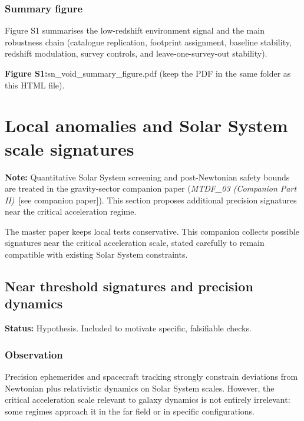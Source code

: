 \documentclass[11pt,a4paper]{article}
\begin{document}
\subsubsection{Summary figure}
Figure S1 summarises the low-redshift environment signal and the main robustness chain (catalogue replication, footprint assignment, baseline stability, redshift modulation, survey controls, and leave-one-survey-out stability).

\begin{mdframed}[linecolor=accent,linewidth=0.5pt,backgroundcolor=callout-bg,leftline=true,rightline=true,topline=true,bottomline=true,innerleftmargin=8pt,innerrightmargin=8pt,innertopmargin=6pt,innerbottommargin=6pt]
\textbf{Figure S1:}sn\_\allowbreak{}void\_\allowbreak{}summary\_\allowbreak{}figure.pdf (keep the PDF in the same folder as this HTML file).
\end{mdframed}

\section{Local anomalies and Solar System scale signatures}
\label{sec:local}
\textbf{Note:} Quantitative Solar System screening and post-Newtonian safety bounds are treated in the gravity-sector companion paper (\textit{MTDF\_\allowbreak{}03 (Companion Part II)}~[see companion paper]). This section proposes additional precision signatures near the critical acceleration regime.

The master paper keeps local tests conservative. This companion collects possible signatures near the critical acceleration scale, stated carefully to remain compatible with existing Solar System constraints.

\subsection{Near threshold signatures and precision dynamics}
\begin{mdframed}[linecolor=accent,linewidth=0.5pt,backgroundcolor=callout-bg,leftline=true,rightline=true,topline=true,bottomline=true,innerleftmargin=8pt,innerrightmargin=8pt,innertopmargin=6pt,innerbottommargin=6pt]
\textbf{Status:} Hypothesis. Included to motivate specific, falsifiable checks.
\end{mdframed}

\subsubsection{Observation}
Precision ephemerides and spacecraft tracking strongly constrain deviations from Newtonian plus relativistic dynamics on Solar System scales. However, the critical acceleration scale relevant to galaxy dynamics is not entirely irrelevant: some regimes approach it in the far field or in specific configurations.
\end{document}
